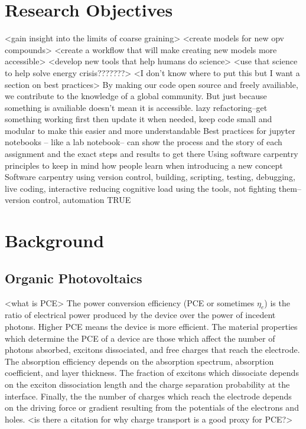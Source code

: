 \section*{Research Objectives}
<gain insight into the limits of coarse graining>
<create models for new opv compounds>
<create a workflow that will make creating new models more accessible>
<develop new tools that help humans do science>
<use that science to help solve energy crisis???????>
<I don't know where to put this but I want a section on best practices>
By making our code open source and freely availiable, we contribute to the knowledge of a global community. But just because something is availiable doesn't mean it is accessible. 
lazy refactoring--get something working first then update it when needed, keep code small and modular to make this easier and more understandable\cite{Adorf2018a} 
Best practices for jupyter notebooks -- like a lab notebook-- can show the process and the story of each assignment and the exact steps and results to get there\cite{Rule2019a}
Using software carpentry principles to keep in mind how people learn when introducing a new concept\cite{https://v4.software-carpentry.org/softeng/principles.html}
Software carpentry using version control, building, scripting, testing, debugging,\cite{Wilson2006}
live coding, interactive \cite{Wilson2016}
reducing cognitive load \cite{Jankowski2019}
using the tools, not fighting them--version control, automation \cite{Wilson2014}
TRUE\cite{Thompson2020}

\section*{Background}

\subsection*{Organic Photovoltaics}
<what is PCE>
The power conversion efficiency (PCE or sometimes $\eta_{e}$) is the ratio of electrical power produced by the device over the power of incedent photons.
Higher PCE means the device is more efficient.  
The material properties which determine the PCE of a device are those which affect the number of photons absorbed, excitons dissociated, and free charges that reach the electrode.
The absorption efficiency depends on the absorption spectrum, absorption coefficient, and layer thickness.
The fraction of excitons which dissociate depends on the exciton dissociation length and the charge separation probability at the interface.
Finally, the the number of charges which reach the electrode depends on the driving force or gradient resulting from the potentials of the electrons and holes.\cite{Hoppe2004}
<is there a citation for why charge transport is a good proxy for PCE?>


